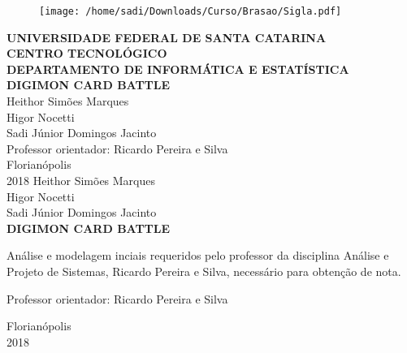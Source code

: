\documentclass[12pt,a4paper,brazil,abntex2]{article}
\begin{document}
\singlespacing
\begin{titlepage}
\begin{center}
\begin{figure}[!htb]
\center

\texttt{[image: /home/sadi/Downloads/Curso/Brasao/Sigla.pdf]} 

\end{figure}
{\bf  UNIVERSIDADE FEDERAL DE SANTA CATARINA}\\[0.2cm] %
{\bf CENTRO TECNOLÓGICO}\\[0.2cm] %
{\bf  DEPARTAMENTO DE INFORMÁTICA E ESTATÍSTICA}\\[5.5cm]
{\bf \large DIGIMON CARD BATTLE}\\[4.1cm] %
{Heithor Simões Marques}\\
{Higor Nocetti}\\
{Sadi Júnior Domingos Jacinto}\\[0.7cm] %
{Professor orientador: Ricardo Pereira e Silva}\\[4.1 cm]
{Florianópolis}\\[0.2cm]
{2018}
\newpage
\thispagestyle{empty}
{Heithor Simões Marques}\\
{Higor Nocetti}\\
{Sadi Júnior Domingos Jacinto}\\[10cm] %
{\bf \large DIGIMON CARD BATTLE}\\[0.5cm]
    \begin{flushright}
    \begin{list}{}{
      \setlength{\leftmargin}{7.2cm}
      \setlength{\rightmargin}{0cm}
      \setlength{\labelwidth}{0pt}
      \setlength{\labelsep}{\leftmargin}}
      \item Análise e modelagem inciais requeridos pelo professor da disciplina Análise e Projeto de Sistemas, Ricardo Pereira e Silva, necessário para obtenção de nota.\\[0.2 cm] 
      \setlength{\labelsep}{\leftmargin}
      \item Professor orientador: Ricardo Pereira e Silva\
      \\[8.2cm]
     \end{list}
	 \end{flushright}
{Florianópolis}\\[0.2cm]
{2018}
\end{center}
\end{titlepage} %
\end{document}
